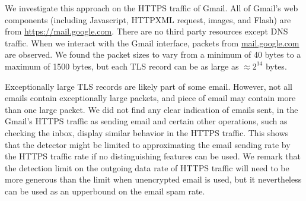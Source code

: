 We investigate this approach on the HTTPS traffic of Gmail. 
All of Gmail's web components (including Javascript, HTTPXML request,
images, and Flash) are from \url{https://mail.google.com}.
There are no third party resources except DNS traffic.
When we interact with the Gmail interface, packets from \url{mail.google.com} are observed.
We found the packet sizes to
vary from a minimum of 40 bytes to a maximum of 1500 bytes,
but each TLS record can be as large as $\approx 2^{14}$ bytes. 

Exceptionally large TLS records are likely part of some email.
However, not all emails contain exceptionally large packets, and piece
of email may contain more than one large packet. 
We did not find any clear indication of emails sent, in the
Gmail's HTTPS traffic as
sending email and certain other operations, such as checking the inbox,
display similar behavior in the HTTPS traffic.
This shows that the detector might be limited to approximating
the email sending rate by the HTTPS traffic rate if no distinguishing
features can be used.
%
We remark that the detection limit on the outgoing data rate of 
HTTPS traffic will need to be more generous than the limit when 
unencrypted email is used, 
but it nevertheless can be used as an upperbound on the email spam rate.




